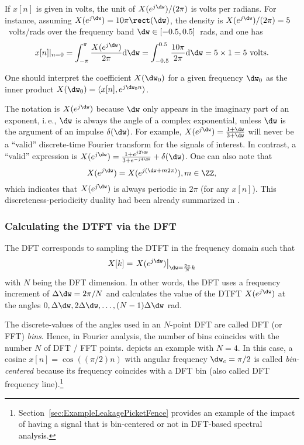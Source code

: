 If $x[n]$ is given in volts, the unit of $X(e^{j \dw})/(2 \pi)$ is volts per radians.
For instance, assuming $X(e^{j \dw})= 10 \pi \rect(\dw)$, the density is $X(e^{j \dw})/(2\pi)=5$~volts/rads over the frequency band $\dw \in [-0.5, 0.5]$~rads, and one has
\[
x[n]|_{n=0} = \int_{-\pi}^\pi \frac{X(e^{j \dw})}{2 \pi} \textrm{d}\dw = \int_{-0.5}^{0.5} \frac{10 \pi}{2 \pi} \textrm{d}\dw = 5 \times 1 = 5~\textrm{volts}. 
\]

One should interpret the coefficient $X(\dw_0)$ for a given frequency $\dw_0$ as the inner product $X(\dw_0) = \langle x[n],e^{j \dw_0 n}\rangle$.

The notation is $X(e^{j\dw})$ because $\dw$ only appears in the imaginary part of an exponent, i.\,e., $\dw$ is always the angle of a complex exponential, unless $\dw$ is the argument of an impulse $\delta(\dw)$. For example, $X(e^{j\dw})=\frac{1+\dw}{3+\dw}$ will never be a ``valid'' discrete-time Fourier transform for the signals of interest. In contrast, a ``valid'' expression is
$X(e^{j\dw})=\frac{1+e^{j2\dw}}{3+e^{-j4\dw}} + \delta(\dw)$.
One can also note that \[X(e^{j\dw}) = X(e^{j(\dw+m 2 \pi)}), m \in \ZZ,\]
which indicates that $X(e^{j\dw})$ is always periodic in $2 \pi$ (for any $x[n]$). This discreteness-periodicity duality had been already summarized in .

\subsubsection{Calculating the DTFT via the DFT}
\label{sec:dtft_via_dft}

The DFT corresponds to sampling the DTFT in the frequency domain such that
\begin{equation}
X[k] = \left. X(e^{j\dw}) \right|_{\dw = \frac{2 \pi }{N} k}
\label{eq:dtft_via_dft}
\end{equation}
with $N$ being the DFT dimension. In other words, the DFT uses a frequency increment of $\Delta \dw = 2 \pi / N$ and calculates the value of the DTFT $X(e^{j\dw})$ at the angles $0, \Delta \dw, 2\Delta \dw, \ldots, (N-1)\Delta \dw$ rad.

The discrete-values of the angles used in an $N$-point DFT are called DFT (or FFT) \emph{bins}. Hence, in Fourier analysis, the number of bins 
coincides with the number $N$ of DFT / FFT points.
 depicts an example with $N=4$. In this case, a cosine $x[n]=\cos((\pi/2) n)$ with angular frequency $\dw_c=\pi/2$ is called \emph{bin-centered}
because its frequency coincides with a DFT bin (also called DFT frequency line).\footnote{Section~\ref{sec:ExampleLeakagePicketFence} provides an example of the impact of having a signal that is bin-centered or not in DFT-based spectral analysis.}

